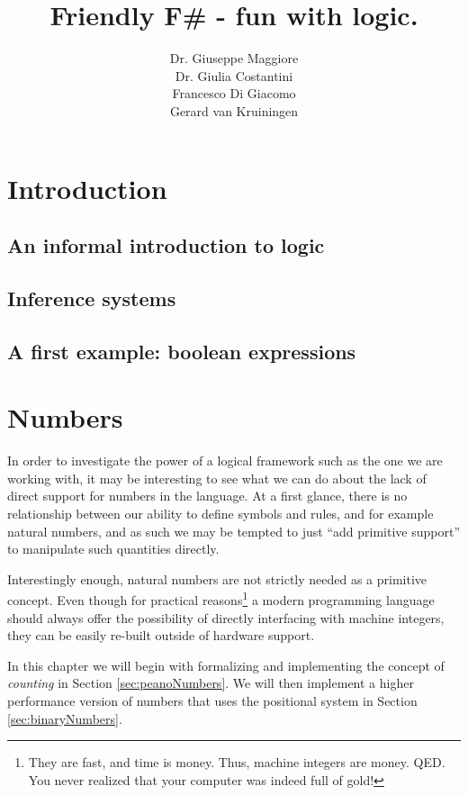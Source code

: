 \documentclass[12pt,b5paper]{book}
\title{Friendly F\# - fun with logic.}
\author{Dr. Giuseppe Maggiore \\
Dr. Giulia Costantini \\
Francesco Di Giacomo \\
Gerard van Kruiningen}
\theoremstyle{definition}
\begin{document}
\maketitle
\tableofcontents

\chapter{Introduction}
\label{sec:introduction}



\section{An informal introduction to logic}
\label{sec:informalIntroduction}



\section{Inference systems}
\label{sec:inferenceSystems}



\section{A first example: boolean expressions}
\label{sec:booleanExpressions}



\chapter{Numbers}
\label{chap:numbers}
In order to investigate the power of a logical framework such as the one we are working with, it may be interesting to see what we can do about the lack of direct support for numbers in the language. At a first glance, there is no relationship between our ability to define symbols and rules, and for example natural numbers, and as such we may be tempted to just ``add primitive support'' to manipulate such quantities directly.

Interestingly enough, natural numbers are not strictly needed as a primitive concept. Even though for practical reasons\footnote{They are fast, and time is money. Thus, machine integers are money. QED. You never realized that your computer was indeed full of gold!} a modern programming language should always offer the possibility of directly interfacing with machine integers, they can be easily re-built outside of hardware support.

In this chapter we will begin with formalizing and implementing the concept of \textit{counting} in Section \ref{sec:peanoNumbers}. We will then implement a higher performance version of numbers that uses the positional system in Section \ref{sec:binaryNumbers}. 
\end{document}

